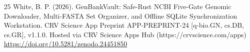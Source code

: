 \documentclass[10pt,letterpaper]{article}
\begin{document}
\begin{thebibliography}{25}
 White, B. P. (2026). GenBankVault: Safe-Rust NCBI Five-Gate Genomic Downloader, Multi-FASTA Set Organizer, and Offline SQLite Synchronization Workstation. CRV Science App Preprint APP-PREPRINT-24 [q-bio.GN, cs.DB, cs.GR], v1.1.0. Hosted via CRV Science Apps Hub (https://crvscience.com/apps) \url{https://doi.org/10.5281/zenodo.24451850}
\end{thebibliography}
\end{document}
